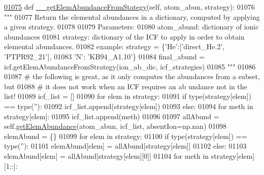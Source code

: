 \begin{DoxyCode}
\hypertarget{classpyneb_1_1core_1_1icf_1_1_i_c_f_l01075}{}\hyperlink{classpyneb_1_1core_1_1icf_1_1_i_c_f_ad5ac374b51b72067f8be614aa31b73e2}{01075}     \textcolor{keyword}{def }\hyperlink{classpyneb_1_1core_1_1icf_1_1_i_c_f_ad5ac374b51b72067f8be614aa31b73e2}{\_\_getElemAbundanceFromStategy}(self, atom\_abun, strategy):
01076         \textcolor{stringliteral}{"""}
01077 \textcolor{stringliteral}{        Return the elemental abundances in a dictionary, computed by applying a given strategy.}
01078 \textcolor{stringliteral}{        }
01079 \textcolor{stringliteral}{        Parameters:}
01080 \textcolor{stringliteral}{            atom\_abund: dictionary of ionic abundances}
01081 \textcolor{stringliteral}{            strategy: dictionary of the ICF to apply in order to obtain elemental abundances.}
01082 \textcolor{stringliteral}{                example: strategy = \{'He':['direct\_He.2', 'PTPR92\_21'], }
01083 \textcolor{stringliteral}{                                   'N': 'KB94\_A1.10'\}}
01084 \textcolor{stringliteral}{            final\_abund = icf.getElemAbundanceFromStrategy(ion\_ab\_dic, icf\_strategies)}
01085 \textcolor{stringliteral}{        """}
01086         
01087         \textcolor{comment}{# the following is great, as it only computes the abundances from a subset, but}
01088         \textcolor{comment}{# it does not work when an ICF requires an ab undance not in the list!}
01089         icf\_list = []
01090         \textcolor{keywordflow}{for} elem \textcolor{keywordflow}{in} strategy:
01091             \textcolor{keywordflow}{if} type(strategy[elem]) == type(\textcolor{stringliteral}{''}):
01092                 icf\_list.append(strategy[elem])
01093             \textcolor{keywordflow}{else}:
01094                 \textcolor{keywordflow}{for} meth \textcolor{keywordflow}{in} strategy[elem]:
01095                     icf\_list.append(meth)
01096                 
01097         allAbund = self.\hyperlink{classpyneb_1_1core_1_1icf_1_1_i_c_f_a30b52d6d1ec148fba7c0a15cad653f61}{getElemAbundance}(atom\_abun, icf\_list, absentIon=np.nan)
01098         elemAbund = \{\}
01099         \textcolor{keywordflow}{for} elem \textcolor{keywordflow}{in} strategy:
01100             \textcolor{keywordflow}{if} type(strategy[elem]) == type(\textcolor{stringliteral}{''}):
01101                 elemAbund[elem] = allAbund[strategy[elem]]
01102             \textcolor{keywordflow}{else}:
01103                 elemAbund[elem] = allAbund[strategy[elem][0]]
01104                 \textcolor{keywordflow}{for} meth \textcolor{keywordflow}{in} strategy[elem][1::]:

\end{DoxyCode}
